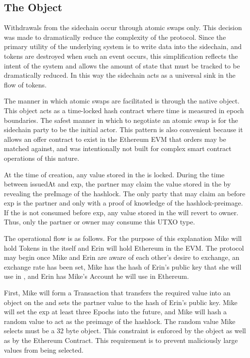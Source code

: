\subsection{The \AtomicSwap{} Object}



Withdrawals from the sidechain occur through atomic swaps only.
This decision was made to dramatically reduce the complexity of the
protocol.
Since the primary utility of the underlying system is to write data
into the sidechain, and tokens are destroyed when such an event occurs,
this simplification reflects the intent of the system and allows the
amount of state that must be tracked to be dramatically reduced.
In this way the sidechain acts as a universal sink in the flow of
tokens.

The manner in which atomic swaps are facilitated is through the native
\AtomicSwap{} object.
This object acts as a time-locked hash contract where time is measured
in epoch boundaries.
The safest manner in which to negotiate an atomic swap is for the
sidechain party to be the initial actor.
This pattern is also convenient because it allows an offer contract to
exist in the Ethereum EVM that orders may be matched against, and
\LayerTwo{} was intentionally not built for complex smart contract
operations of this nature.

At the time of creation, any value stored in the \AtomicSwap{} is locked.
During the time between issuedAt and exp, the partner may claim the
value stored in the \AtomicSwap{} by revealing the preImage of the
hashlock.
The only party that may claim an \AtomicSwap{} before exp is the partner
and only with a proof of knowledge of the hashlock-preimage.
If the \AtomicSwap{} is not consumed before exp, any value stored in the
\AtomicSwap{} will revert to owner.
Thus, only the partner or owner may consume this UTXO type.

The operational flow is as follows.
For the purpose of this explanation Mike will hold \LayerTwoLong{} Tokens in
the \LayerTwoLong{} itself and Erin will hold Ethereum in the EVM.
The protocol may begin once Mike and Erin are aware of each other's
desire to exchange, an exchange rate has been set, Mike has the hash of
Erin's public key that she will use in \LayerTwoLong{}, and Erin has
Mike's Account he will use in Ethereum.

First, Mike will form a Transaction that transfers the required value
into an \AtomicSwap{} object on the \LayerTwoLong{} and sets the partner value
to the hash of Erin's public key.
Mike will set the exp at least three Epochs into the future, and Mike
will hash a random value to act as the preimage of the hashlock.
The random value Mike selects must be a 32 byte object.
This constraint is enforced by the \LayerTwoLong{} \AtomicSwap{} object as well
as by the Ethereum \AtomicSwap{}Contract.
This requirement is to prevent maliciously large values from being
selected.


